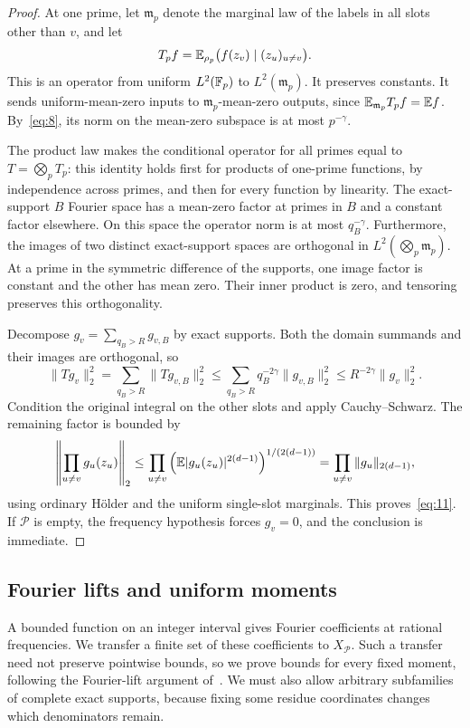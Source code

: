 \begin{proof}
At one prime, let \(\mathfrak m_p\) denote the marginal law of the labels in all
slots other than \(v\), and let
\[
 T_p f=\mathbb E_{\rho_p}\bigl(f(z_v)\mid(z_u)_{u\ne v}\bigr).
\]
This is an operator from uniform \(L^2(\mathbb F_p)\) to \(L^2(\mathfrak m_p)\).
It preserves constants.  It sends uniform-mean-zero inputs to
\(\mathfrak m_p\)-mean-zero outputs, since \(\mathbb E_{\mathfrak m_p}T_pf=\mathbb E f\).
By~\eqref{eq:8}, its norm on the mean-zero subspace is at most
\(p^{-\gamma}\).

The product law makes the conditional operator for all primes equal
to \(T=\bigotimes_pT_p\): this identity holds first for products of
one-prime functions, by independence across primes, and then for every
function by linearity.  The exact-support \(B\) Fourier space has a
mean-zero factor at primes in \(B\) and a constant factor elsewhere.
On this space the operator norm is at most \(q_B^{-\gamma}\).
Furthermore, the images of two distinct exact-support spaces are
orthogonal in \(L^2(\bigotimes_p\mathfrak m_p)\).  At a prime in the symmetric
difference of the supports, one image factor is constant and the other
has mean zero.  Their inner product is zero, and tensoring preserves
this orthogonality.

Decompose \(g_v=\sum_{q_B>R}g_{v,B}\) by exact supports.  Both the
domain summands and their images are orthogonal, so
\[
 \|Tg_v\|_2^2
 =\sum_{q_B>R}\|Tg_{v,B}\|_2^2
 \le\sum_{q_B>R}q_B^{-2\gamma}\|g_{v,B}\|_2^2
 \le R^{-2\gamma}\|g_v\|_2^2.
\]
Condition the original integral on the other slots and apply
Cauchy--Schwarz.  The remaining factor is bounded by
\[
 \left\|\prod_{u\ne v}g_u(z_u)\right\|_2
 \le\prod_{u\ne v}
       \left(\mathbb E|g_u(z_u)|^{2(d-1)}\right)^{1/(2(d-1))}
 =\prod_{u\ne v}\|g_u\|_{2(d-1)},
\]
using ordinary H\"older and the uniform single-slot marginals.
This proves~\eqref{eq:11}.  If \(\mathcal P\) is empty, the frequency
hypothesis forces \(g_v=0\), and the conclusion is immediate.
\end{proof}

\subsection{Fourier lifts and uniform moments}

A bounded function on an integer interval gives Fourier coefficients at
rational frequencies.  We transfer a finite set of these coefficients
to \(X_{\mathcal P}\).  Such a transfer need not preserve pointwise
bounds, so we prove bounds for every fixed moment, following the
Fourier-lift argument of~\cite[Lemmas~5.1--5.2]{squarepower}.  We must also allow
arbitrary subfamilies of complete exact supports, because fixing some
residue coordinates changes which denominators remain.

